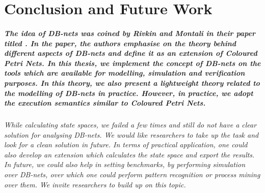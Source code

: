 \chapter{Conclusion and Future Work}

\paragraph*{\textnormal{The idea of DB-nets was coined by Rivkin and Montali in their paper titled \cite{DBLP:journals/corr/DBNets}. In the paper, the authors emphasise on the theory behind different aspects of DB-nets and define it as an extension of Coloured Petri Nets. In this thesis, we implement the concept of DB-nets on the tools which are available for modelling, simulation and verification purposes. In this theory, we also present a lightweight theory related to the modelling of DB-nets in practice. However, in practice, we adopt the execution semantics similar to Coloured Petri Nets.}}

\subparagraph*{\textnormal{While calculating state spaces, we failed a few times and still do not have a clear solution for analysing DB-nets. We would like researchers to take up the task and look for a clean solution in future. In terms of practical application, one could also develop an extension which calculates the state space and export the results. In future, we could also help in setting benchmarks, by performing simulation over DB-nets, over which one could perform pattern recognition or process mining over them. We invite researchers to build up on this topic.}}